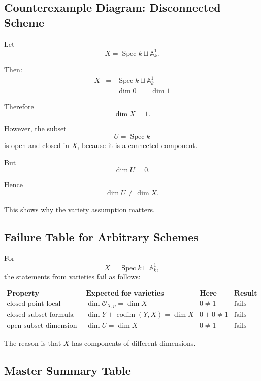 \documentclass[12pt,a4paper]{article}
\theoremstyle{notespace}
\begin{document}
\subsection{Counterexample Diagram: Disconnected Scheme}

Let
\[
X=\operatorname{Spec} k\sqcup \mathbb A^1_k.
\]

Then:
\[
\begin{array}{ccc}
	X
	&=&
	\operatorname{Spec} k
	\sqcup
	\mathbb A^1_k
	\\[0.7em]
	&&
	\dim 0
	\qquad
	\dim 1
\end{array}
\]

Therefore
\[
\dim X=1.
\]

However, the subset
\[
U=\operatorname{Spec} k
\]
is open and closed in \(X\), because it is a connected component.

But
\[
\dim U=0.
\]

Hence
\[
\boxed{
	\dim U\neq \dim X.
}
\]

This shows why the variety assumption matters.

\subsection{Failure Table for Arbitrary Schemes}

For
\[
X=\operatorname{Spec} k\sqcup \mathbb A^1_k,
\]
the statements from varieties fail as follows:

\[
\begin{array}{c|c|c|c}
	\textbf{Property}
	&
	\textbf{Expected for varieties}
	&
	\textbf{Here}
	&
	\textbf{Result}
	\\
	\hline
	\text{closed point local dimension}
	&
	\dim \mathcal O_{X,p}=\dim X
	&
	0\neq 1
	&
	\text{fails}
	\\
	\text{closed subset formula}
	&
	\dim Y+\operatorname{codim}(Y,X)=\dim X
	&
	0+0\neq 1
	&
	\text{fails}
	\\
	\text{open subset dimension}
	&
	\dim U=\dim X
	&
	0\neq 1
	&
	\text{fails}
\end{array}
\]

The reason is that \(X\) has components of different dimensions.

\subsection{Master Summary Table}
\end{document}
